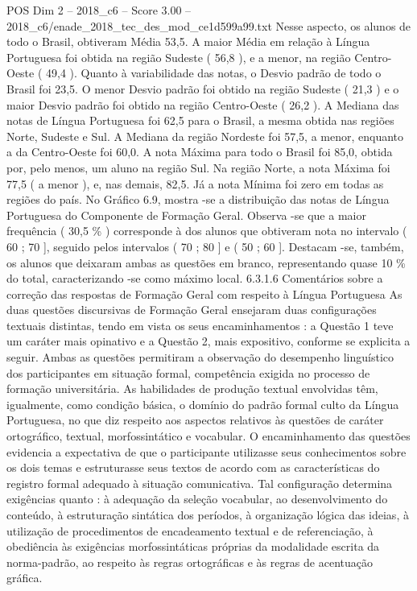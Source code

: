 \begin{textsample}{POS Dim 2 – 2018\_c6 – Score 3.00 – 2018\_c6/enade\_2018\_tec\_des\_mod\_ce1d599a99.txt}
Nesse aspecto, os alunos de todo o Brasil, obtiveram Média 53,5.
A maior Média em relação à Língua Portuguesa foi obtida na região Sudeste ( 56,8 ), e a menor, na região Centro-Oeste ( 49,4 ).
Quanto à variabilidade das notas, o Desvio padrão de todo o Brasil foi 23,5.
O menor Desvio padrão foi obtido na região Sudeste ( 21,3 ) e o maior Desvio padrão foi obtido na região Centro-Oeste ( 26,2 ).
A Mediana das notas de Língua Portuguesa foi 62,5 para o Brasil, a mesma obtida nas regiões Norte, Sudeste e Sul.
A Mediana da região Nordeste foi 57,5, a menor, enquanto a da Centro-Oeste foi 60,0.
A nota Máxima para todo o Brasil foi 85,0, obtida por, pelo menos, um aluno na região Sul.
Na região Norte, a nota Máxima foi 77,5 ( a menor ), e, nas demais, 82,5.
Já a nota Mínima foi zero em todas as regiões do país.
No Gráfico 6.9, mostra -se a distribuição das notas de Língua Portuguesa do Componente de Formação Geral.
Observa -se que a maior frequência ( 30,5 \% ) corresponde à dos alunos que obtiveram nota no intervalo ( 60 ; 70 ], seguido pelos intervalos ( 70 ; 80 ] e ( 50 ; 60 ].
Destacam -se, também, os alunos que deixaram ambas as questões em branco, representando quase 10 \% do total, caracterizando -se como máximo local. 6.3.1.6 Comentários sobre a correção das respostas de Formação Geral com respeito à Língua Portuguesa As duas questões discursivas de Formação Geral ensejaram duas configurações textuais distintas, tendo em vista os seus encaminhamentos : a Questão 1 teve um caráter mais opinativo e a Questão 2, mais expositivo, conforme se explicita a seguir.
Ambas as questões permitiram a observação do desempenho linguístico dos participantes em situação formal, competência exigida no processo de formação universitária.
As habilidades de produção textual envolvidas têm, igualmente, como condição básica, o domínio do padrão formal culto da Língua Portuguesa, no que diz respeito aos aspectos relativos às questões de caráter ortográfico, textual, morfossintático e vocabular.
O encaminhamento das questões evidencia a expectativa de que o participante utilizasse seus conhecimentos sobre os dois temas e estruturasse seus textos de acordo com as características do registro formal adequado à situação comunicativa.
Tal configuração determina exigências quanto : à adequação da seleção vocabular, ao desenvolvimento do conteúdo, à estruturação sintática dos períodos, à organização lógica das ideias, à utilização de procedimentos de encadeamento textual e de referenciação, à obediência às exigências morfossintáticas próprias da modalidade escrita da norma-padrão, ao respeito às regras ortográficas e às regras de acentuação gráfica.

\end{textsample}
